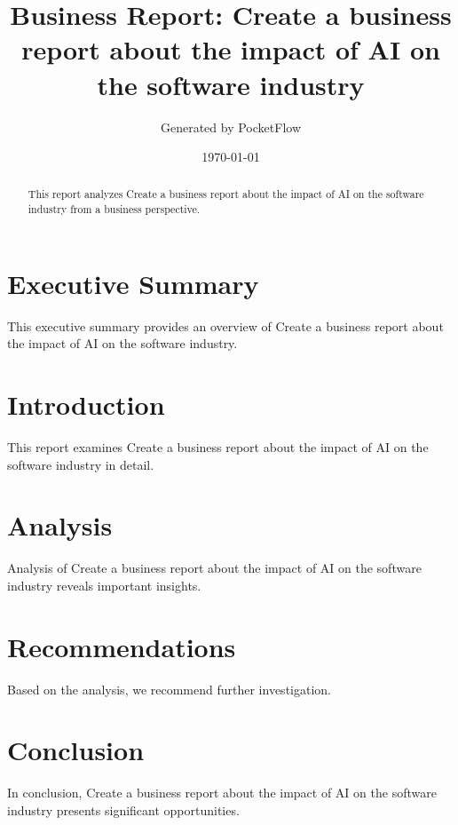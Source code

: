 \documentclass[11pt,a4paper]{article}
\begin{document}
\title{Business Report: Create a business report about the impact of AI on the software industry}
\author{Generated by PocketFlow}
\date{\today}

\maketitle

\begin{abstract}
This report analyzes Create a business report about the impact of AI on the software industry from a business perspective.
\end{abstract}

\tableofcontents
\newpage

\section{Executive Summary}
This executive summary provides an overview of Create a business report about the impact of AI on the software industry.

\section{Introduction}
This report examines Create a business report about the impact of AI on the software industry in detail.

\section{Analysis}
Analysis of Create a business report about the impact of AI on the software industry reveals important insights.

\section{Recommendations}
Based on the analysis, we recommend further investigation.

\section{Conclusion}
In conclusion, Create a business report about the impact of AI on the software industry presents significant opportunities.
\end{document}
